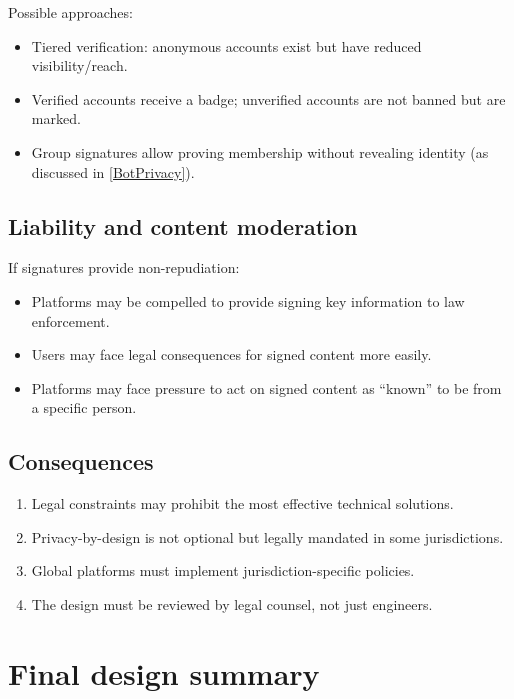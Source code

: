 Possible approaches:
\begin{itemize}
  \item Tiered verification: anonymous accounts exist but have reduced 
    visibility/reach.
  \item Verified accounts receive a badge; unverified accounts are not banned 
    but are marked.
  \item Group signatures allow proving membership without revealing identity 
    (as discussed in \cref{BotPrivacy}).
\end{itemize}

\subsection{Liability and content moderation}

If signatures provide non-repudiation:
\begin{itemize}
  \item Platforms may be compelled to provide signing key information to law 
    enforcement.
  \item Users may face legal consequences for signed content more easily.
  \item Platforms may face pressure to act on signed content as \enquote{known} 
    to be from a specific person.
\end{itemize}

\subsection{Consequences}

\begin{enumerate}
  \item Legal constraints may prohibit the most effective technical solutions.
  \item Privacy-by-design is not optional but legally mandated in some 
    jurisdictions.
  \item Global platforms must implement jurisdiction-specific policies.
  \item The design must be reviewed by legal counsel, not just engineers.
\end{enumerate}


\section{Final design summary}


